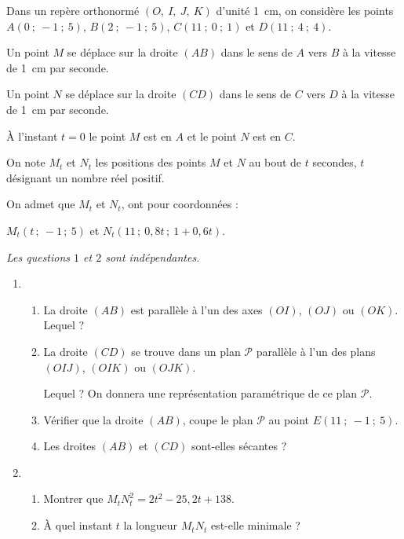 \documentclass{cornouaille}
\begin{document}
\begin{exercice}
  Dans un repère orthonormé $(O,~I,~J,~K)$ d'unité 1~cm, on considère
  les points $A(0~;~-1~;~5)$, $B(2~;~-1~;~5)$, $C(11~;~0~;~1)$ et
  $D(11~;~4~;~4)$.

  Un point $M$ se déplace sur la droite $(AB)$ dans le sens de $A$ vers $B$
  à la vitesse de 1~cm par seconde.

  Un point $N$ se déplace sur la droite $(CD)$ dans le sens de $C$ vers $D$
  à la vitesse de 1~cm par seconde.

  À l'instant $t = 0$ le point $M$ est en $A$ et le point $N$ est en $C$.

  On note $M_t$ et $N_t$ les positions des points $M$ et $N$ au bout
  de $t$ secondes, $t$ désignant un nombre réel positif.

  On admet que $M_t$ et $N_t$, ont pour coordonnées :

  $M_t(t\,;\ -1\,;\ 5)$ et $N_t(11\,;\ 0,8t\,;\ 1 + 0,6 t)$.

  \emph{Les questions $1$ et $2$ sont indépendantes.}

\begin{enumerate}
\item
  \begin{enumerate}
  \item La droite $(AB)$ est parallèle à l'un des axes $(OI)$, $(OJ)$ ou
    $(OK)$. Lequel ?
  \item La droite $(CD)$ se trouve dans un plan $\mathcal{P}$ parallèle
    à l'un des plans $(OIJ)$, $(OIK)$ ou $(OJK)$.
		
    Lequel ? On donnera une représentation paramétrique de ce plan
    $\mathcal{P}$.
  \item Vérifier que la droite $(AB)$, coupe le plan $\mathcal{P}$ au
    point $E(11~;~-1~;~5)$.
  \item Les droites $(AB)$ et $(CD)$ sont-elles sécantes ?
  \end{enumerate}
\item
  \begin{enumerate}
  \item Montrer que $M_t^{}N_t ^2 = 2 t^2 - 25,2 t + 138$.
  \item À quel instant $t$ la longueur $M_tN_t$ est-elle minimale ?
  \end{enumerate}
\end{enumerate}
\end{exercice}
\end{document}
